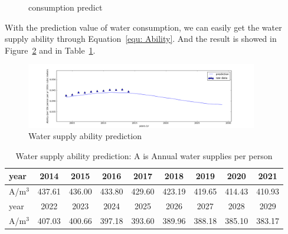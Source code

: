   \begin{figure}[!h]
  \caption{consumption predict}
  \label{fig: consumption predict}
  \end{figure}

  With the prediction value of water consumption, we can easily get the water supply ability through Equation~\ref{equ: Ability}. And the result is showed in Figure~\ref{fig: supply ability} and in Table~\ref{tab: supply ability}.


  \begin{figure}[!h]
  \includegraphics[width = 0.9\textwidth]{picture/Ability-pre.png}
  \caption{Water supply ability prediction}
  \label{fig: supply ability}
  \end{figure}
  \begin{table}[!h]
  \centering
  \begin{tabular}{|l ||c|c|c|c|c|c|c|c|}
  \hline
  year & 2014 & 2015 & 2016 & 2017 & 2018 & 2019 & 2020& 2021 \\ \hline
  A/$\text{m}^3$ & 437.61 &436.00 &433.80 &429.60 & 423.19 & 419.65 &414.43 & 410.93 \\ \hline \hline
  year & 2022 & 2023 & 2024 & 2025 & 2026 & 2027 & 2028& 2029 \\ \hline
  A/$\text{m}^3$ & 407.03 & 400.66 & 397.18 &393.60 & 389.96 & 388.18 & 385.10 & 383.17 \\ \hline
  \end{tabular}
  \caption{Water supply ability prediction: A is Annual water supplies per person}
  \label{tab: supply ability}
  \end{table}

